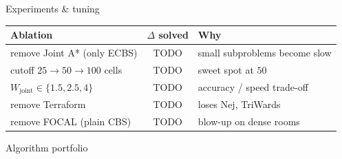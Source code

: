 \begin{frame}{Experiments \& tuning}
  \begin{center}
    \begin{tabular}{@{}l c l@{}}
      \toprule
      \textbf{Ablation} & \textbf{$\Delta$ solved} & \textbf{Why}\\
      \midrule
      remove Joint A* (only ECBS)        & TODO & small subproblems become slow \\
      cutoff $25 \to 50 \to 100$ cells   & TODO & sweet spot at $50$            \\
      $W_{\text{joint}} \in \{1.5, 2.5, 4\}$ & TODO & accuracy / speed trade-off \\
      remove Terraform                   & TODO & loses Nej, TriWards            \\
      remove FOCAL (plain CBS)           & TODO & blow-up on dense rooms         \\
      \bottomrule
    \end{tabular}
  \end{center}

  \vspace{0.4cm}
  \begin{center}
    \footnotesize\textcolor{muted}{Algorithm portfolio}
  \end{center}
\end{frame}
